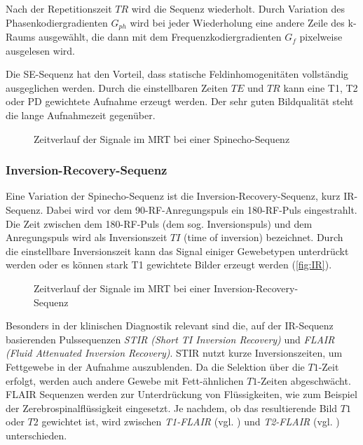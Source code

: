 Nach der Repetitionszeit $TR$ wird die Sequenz wiederholt. Durch Variation des Phasenkodiergradienten $G_{ph}$ wird bei jeder Wiederholung eine andere Zeile des k-Raums ausgewählt, die dann mit dem Frequenzkodiergradienten $G_f$ pixelweise ausgelesen wird.


Die SE-Sequenz hat den Vorteil, dass statische Feldinhomogenitäten vollständig ausgeglichen werden. Durch die einstellbaren Zeiten $TE$ und $TR$ kann eine T1, T2 oder PD gewichtete Aufnahme erzeugt werden.
Der sehr guten Bildqualität steht die lange Aufnahmezeit gegenüber.

\begin{figure}[H]
	\centering
	\caption[Spinecho-Sequenz]{Zeitverlauf der Signale im MRT bei einer Spinecho-Sequenz}
	\label{fig:SE}
\end{figure}

\subsubsection{Inversion-Recovery-Sequenz}
Eine Variation der Spinecho-Sequenz ist die Inversion-Recovery-Sequenz, kurz IR-Sequenz. Dabei wird vor dem 90\degree-RF-Anregungspuls ein 180\degree-RF-Puls eingestrahlt. Die Zeit zwischen dem 180\degree-RF-Puls (dem sog. Inversionspuls) und dem Anregungspuls wird als Inversionszeit $TI$ (time of inversion) bezeichnet. Durch die einstellbare Inversionszeit kann das Signal einiger Gewebetypen unterdrückt werden oder es können stark T1 gewichtete Bilder erzeugt werden (\autoref{fig:IR}).

\begin{figure}[H]
	\centering
	\caption[Inversion-Recovery-Sequenz]{Zeitverlauf der Signale im MRT bei einer Inversion-Recovery-Sequenz}
	\label{fig:IR}
\end{figure}

Besonders in der klinischen Diagnostik relevant sind die, auf der IR-Sequenz basierenden Pulssequenzen \textit{STIR (Short TI Inversion Recovery)} und \textit{FLAIR (Fluid Attenuated Inversion Recovery)}.
STIR nutzt kurze Inversionszeiten, um Fettgewebe in der Aufnahme auszublenden. Da die Selektion über die $T1$-Zeit erfolgt, werden auch andere Gewebe mit Fett-ähnlichen $T1$-Zeiten abgeschwächt\cite{Bydder1985}.
FLAIR Sequenzen werden zur Unterdrückung von Flüssigkeiten, wie zum Beispiel der Zerebrospinalflüssigkeit eingesetzt. Je nachdem, ob das resultierende Bild $T1$ oder $T2$ gewichtet ist, wird zwischen \textit{T1-FLAIR} (vgl. \cite{Melhem1997}) und \textit{T2-FLAIR} (vgl. \cite{Hajnal1992}) unterschieden\cite{Bakshi2001}.

